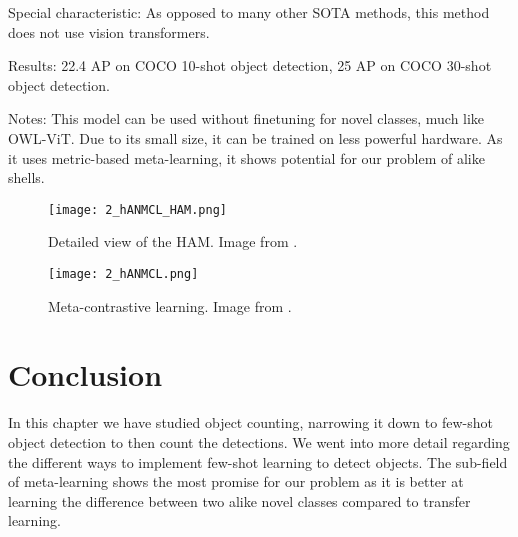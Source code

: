 Special characteristic: As opposed to many other SOTA methods, this method does not use vision transformers.

Results: 22.4 AP on COCO 10-shot object detection, 25 AP on COCO 30-shot object detection.

Notes: This model can be used without finetuning for novel classes, much like OWL-ViT. Due to its small size, it can be trained on less powerful hardware. As it uses metric-based meta-learning, it shows potential for our problem of alike shells.

\begin{figure}[H]
	\centering
	\texttt{[image: 2\_hANMCL\_HAM.png]}
	\caption{\label{fig:2_hANMCL_HAM} Detailed view of the HAM. Image from \citet{hANMCL}.}
\end{figure}

\begin{figure}[H]
	\centering
	\texttt{[image: 2\_hANMCL.png]}
	\caption{\label{fig:2_hANMCL} Meta-contrastive learning. Image from \citet{hANMCL}.}
\end{figure}

\section{Conclusion}
In this chapter we have studied object counting, narrowing it down to few-shot object detection to then count the detections. We went into more detail regarding the different ways to implement few-shot learning to detect objects. The sub-field of meta-learning shows the most promise for our problem as it is better at learning the difference between two alike novel classes compared to transfer learning.